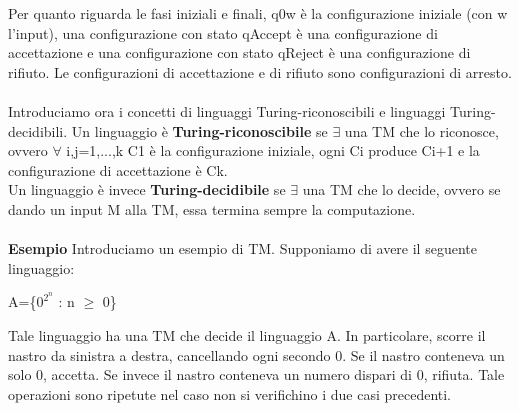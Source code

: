 \documentclass[]{article}
\begin{document}
			Per quanto riguarda le fasi iniziali e finali, q0w è la configurazione iniziale (con w l'input), una configurazione con stato qAccept è una configurazione di accettazione e una configurazione con stato qReject è una configurazione di rifiuto. Le configurazioni di accettazione e di rifiuto sono configurazioni di arresto.\\\\
			Introduciamo ora i concetti di linguaggi Turing-riconoscibili e linguaggi Turing-decidibili. Un linguaggio è \textbf{Turing-riconoscibile} se $\exists$ una TM che lo riconosce, ovvero $\forall$ i,j=1,...,k C1 è la configurazione iniziale, ogni Ci produce Ci+1 e la configurazione di accettazione è Ck.\\ Un linguaggio è invece \textbf{Turing-decidibile} se $\exists$ una TM che lo decide, ovvero se dando un input M alla TM, essa termina sempre la computazione.\\\\
			\textbf{Esempio} Introduciamo un esempio di TM. Supponiamo di avere il seguente linguaggio:
			\begin{center}
				A=\{$0^{2^n}$ : n $\geq$ 0\}
			\end{center}
			Tale linguaggio ha una TM che decide il linguaggio A. In particolare, scorre il nastro da sinistra a destra, cancellando ogni secondo 0. Se il nastro conteneva un solo 0, accetta. Se invece il nastro conteneva un numero dispari di 0, rifiuta. Tale operazioni sono ripetute nel caso non si verifichino i due casi precedenti.
\end{document}
